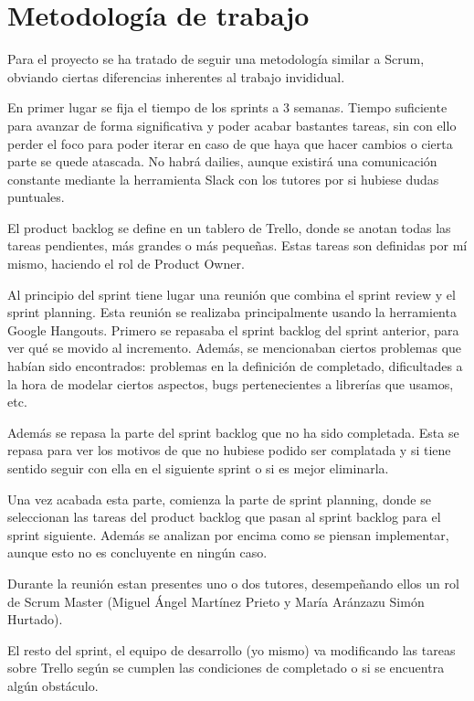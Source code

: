 \documentclass[12pt]{report} %
\begin{document}
\section{Metodología de trabajo}
Para el proyecto se ha tratado de seguir una metodología similar a Scrum, obviando ciertas diferencias inherentes al trabajo invididual.

En primer lugar se fija el tiempo de los sprints a 3 semanas. Tiempo suficiente para avanzar de forma significativa y poder acabar bastantes tareas, sin con ello perder el foco para poder iterar en caso de que haya que hacer cambios o cierta parte se quede atascada. No habrá dailies, aunque existirá una comunicación constante mediante la herramienta Slack con los tutores por si hubiese dudas puntuales.

El product backlog se define en un tablero de Trello, donde se anotan todas las tareas pendientes, más grandes o más pequeñas. Estas tareas son definidas por mí mismo, haciendo el rol de Product Owner.

Al principio del sprint tiene lugar una reunión que combina el sprint review y el sprint planning. Esta reunión se realizaba principalmente usando la herramienta Google Hangouts. Primero se repasaba el sprint backlog del sprint anterior, para ver qué se movido al incremento. Además, se mencionaban ciertos problemas que habían sido encontrados: problemas en la definición de completado, dificultades a la hora de modelar ciertos aspectos, bugs pertenecientes a librerías que usamos, etc.

Además se repasa la parte del sprint backlog que no ha sido completada. Esta se repasa para ver los motivos de que no hubiese podido ser complatada y si tiene sentido seguir con ella en el siguiente sprint o si es mejor eliminarla.

Una vez acabada esta parte, comienza la parte de sprint planning, donde se seleccionan las tareas del product backlog que pasan al sprint backlog para el sprint siguiente. Además se analizan por encima como se piensan implementar, aunque esto no es concluyente en ningún caso.

Durante la reunión estan presentes uno o dos tutores, desempeñando ellos un rol de Scrum Master (Miguel Ángel Martínez Prieto y María Aránzazu Simón Hurtado).

El resto del sprint, el equipo de desarrollo (yo mismo) va modificando las tareas sobre Trello según se cumplen las condiciones de completado o si se encuentra algún obstáculo.
\end{document}
